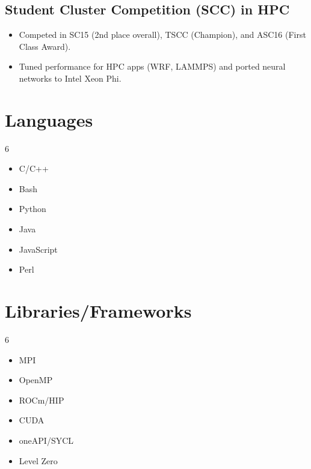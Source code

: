 \documentclass[10pt,a4paper,sans]{moderncv}          %
\begin{document}
\subsection{Student Cluster Competition (SCC) in HPC}
\begin{itemize}
    \item Competed in SC15 (2nd place overall), TSCC (Champion), and ASC16 (First Class Award).
    \item Tuned performance for HPC apps (WRF, LAMMPS) and ported neural networks to Intel Xeon Phi.
\end{itemize}

\section{Languages}
\begin{multicols}{6}
\begin{itemize}%
\item C/C++
\item Bash
\item Python
\item Java
\item JavaScript
\item Perl
\end{itemize}
\end{multicols}

\section{Libraries/Frameworks}
\begin{multicols}{6}
\begin{itemize}%
\item MPI
\item OpenMP
\item ROCm/HIP
\item CUDA
\item oneAPI/SYCL
\item Level Zero
\end{itemize}
\end{multicols}

% 

\nocite{*}
\printbibliography[keyword={journal}, title=Journals, resetnumbers=true]
\printbibliography[keyword={paper}, title=Conferences and Workshops, resetnumbers=false]
\printbibliography[keyword={poster}, title=Posters, resetnumbers=false]
\end{document}
